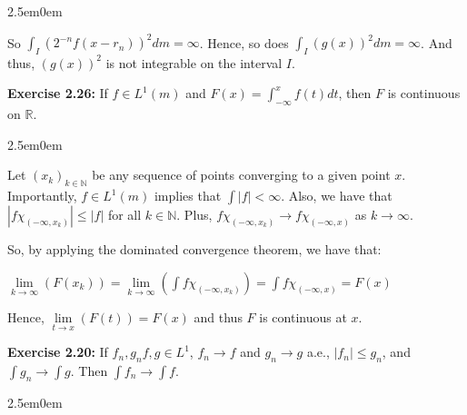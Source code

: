 \documentclass{book}
\newcommand{\exOne}{%
   \color{Purple}%
   \fontsize{13}{15}\selectfont%
}
\newcommand{\exTwoP}{%
   \color{RedViolet}%
   \fontsize{13}{15}\selectfont%
}
\newenvironment{myIndent}{%
   \begin{adjustwidth}{2.5em}{0em}%
}{%
   \end{adjustwidth}%
}
\newcommand{\blab}[1]{\textbf{#1}}
\newcommand{\retTwo}{\hfill\bigbreak}
\begin{document}
\begin{enumerate}
\begin{myIndent}
      So $\int_I (2^{-n}f(x - r_n))^2 dm = \infty$. Hence, so does $\int_I(g(x))^2dm = \infty$. And thus, $(g(x))^2$ is not integrable on the interval $I$.
      \retTwo
   \end{myIndent}
\end{enumerate}

\retTwo

\blab{Exercise 2.26:} If $f \in L^1(m)$ and $F(x) = \int_{-\infty}^x f(t)dt$, then $F$ is continuous on $\mathbb{R}$.

\begin{myIndent}\exTwoP
   Let $(x_k)_{k \in \mathbb{N}}$ be any sequence of points converging to a given point $x$. Importantly, $f \in L^1(m)$ implies that $\int |f| < \infty$. Also,  we have that $|f\chi_{(-\infty, x_k)}| \leq |f|$ for all $k \in \mathbb{N}$. Plus, $f\chi_{(-\infty, x_k)} \rightarrow f\chi_{(-\infty, x)}$ as $k \rightarrow \infty$.\retTwo

   So, by applying the dominated convergence theorem, we have that:

   {\centering $\lim\limits_{k \rightarrow \infty}(F(x_k)) = \lim\limits_{k\rightarrow \infty} (\int f\chi_{(-\infty, x_k)}) = \int f\chi_{(-\infty, x)} = F(x)$\retTwo\par}

   Hence, $\lim\limits_{t \rightarrow x}(F(t)) = F(x)$ and thus $F$ is continuous at $x$.
\end{myIndent}

\newpage

\blab{Exercise 2.20:} If $f_n, g_n f, g \in L^1$, $f_n \rightarrow f$ and $g_n \rightarrow g$ a.e., $|f_n| \leq g_n$, and $\int g_n \rightarrow \int g$. Then $\int f_n \rightarrow \int f$. 

\begin{myIndent}\exTwoP
   
\end{myIndent}


















\end{document}

